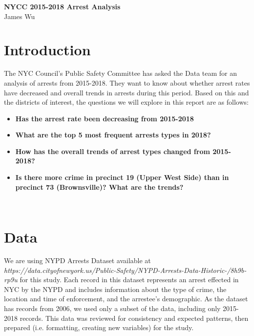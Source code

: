 \documentclass[11pt]{article}\usepackage[]{graphicx}\usepackage[]{color}
\begin{document}
\begin{center}
\textbf{NYCC 2015-2018 Arrest Analysis}\\
\normalsize{James Wu}
\end{center}




\section{Introduction}
The NYC Council's Public Safety Committee has asked the Data team for an analysis of arrests from 2015-2018. They want to know about whether arrest rates have decreased and overall trends in arrests during this period. Based on this and the districts of interest, the questions we will explore in this report are as follows:
\begin{itemize}
  \item \textbf{Has the arrest rate been decreasing from 2015-2018}
  \item \textbf{What are the top 5 most frequent arrests types in 2018?}
  \item \textbf{How has the overall trends of arrest types changed from 2015-2018?}
  \item \textbf{Is there more crime in precinct 19 (Upper West Side) than in precinct 73 (Brownsville)? What are the trends?}
\end{itemize}
\\

\section{Data}
We are using NYPD Arrests Dataset available at \emph{https://data.cityofnewyork.us/Public-Safety/NYPD-Arrests-Data-Historic-/8h9b-rp9u} for this study. Each record in this dataset represents an arrest effected in NYC by the NYPD and includes information about the type of crime, the location and time of enforcement, and the arrestee's demographic. As the dataset has records from 2006, we used only a subset of the data, including only 2015-2018 records. This data was reviewed for consistency and expected patterns, then prepared (i.e. formatting, creating new variables) for the study.
\end{document}
